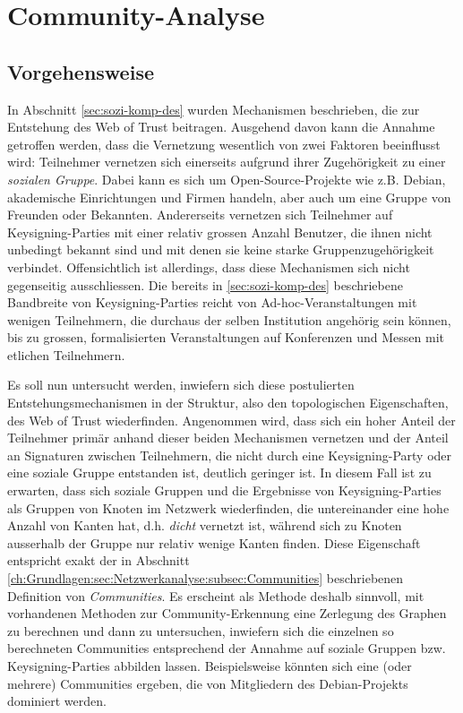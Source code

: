 \section{Community-Analyse}
\label{sec:community-analyse}

\subsection{Vorgehensweise}
\label{sec:vorgehensweise}

In Abschnitt \ref{sec:sozi-komp-des} wurden Mechanismen beschrieben,
die zur Entstehung des Web of Trust beitragen. Ausgehend davon kann
die Annahme getroffen werden, dass die Vernetzung wesentlich von zwei
Faktoren beeinflusst wird: Teilnehmer vernetzen sich einerseits
aufgrund ihrer Zugeh\"origkeit zu einer \emph{sozialen Gruppe}. Dabei
kann es sich um Open-Source-Projekte wie z.B. Debian, akademische
Einrichtungen und Firmen handeln, aber auch um eine Gruppe von
Freunden oder Bekannten. Andererseits vernetzen sich Teilnehmer auf
Keysigning-Parties mit einer relativ grossen Anzahl Benutzer, die
ihnen nicht unbedingt bekannt sind und mit denen sie keine starke
Gruppenzugeh\"origkeit verbindet. Offensichtlich ist allerdings, dass
diese Mechanismen sich nicht gegenseitig ausschliessen. Die bereits in
\ref{sec:sozi-komp-des} beschriebene Bandbreite von Keysigning-Parties
reicht von Ad-hoc-Veranstaltungen mit wenigen Teilnehmern, die
durchaus der selben Institution angeh\"orig sein k\"onnen, bis zu
grossen, formalisierten Veranstaltungen auf Konferenzen und Messen mit
etlichen Teilnehmern.

Es soll nun untersucht werden, inwiefern sich diese postulierten
Entstehungsmechanismen in der Struktur, also den topologischen
Eigenschaften, des Web of Trust wiederfinden. Angenommen wird, dass
sich ein hoher Anteil der Teilnehmer prim\"ar anhand dieser beiden
Mechanismen vernetzen und der Anteil an Signaturen zwischen
Teilnehmern, die nicht durch eine Keysigning-Party oder eine soziale
Gruppe entstanden ist, deutlich geringer ist. In diesem Fall ist zu
erwarten, dass sich soziale Gruppen und die Ergebnisse von
Keysigning-Parties als Gruppen von Knoten im Netzwerk wiederfinden,
die untereinander eine hohe Anzahl von Kanten hat, d.h. \emph{dicht}
vernetzt ist, w\"ahrend sich zu Knoten ausserhalb der Gruppe nur
relativ wenige Kanten finden. Diese Eigenschaft entspricht exakt der
in Abschnitt
\ref{ch:Grundlagen:sec:Netzwerkanalyse:subsec:Communities}
beschriebenen Definition von \emph{Communities}. Es erscheint als
Methode deshalb sinnvoll, mit vorhandenen Methoden zur
Community-Erkennung eine Zerlegung des Graphen zu berechnen und dann
zu untersuchen, inwiefern sich die einzelnen so berechneten
Communities entsprechend der Annahme auf soziale Gruppen
bzw. Keysigning-Parties abbilden lassen. Beispielsweise k\"onnten sich
eine (oder mehrere) Communities ergeben, die von Mitgliedern des
Debian-Projekts dominiert werden.

